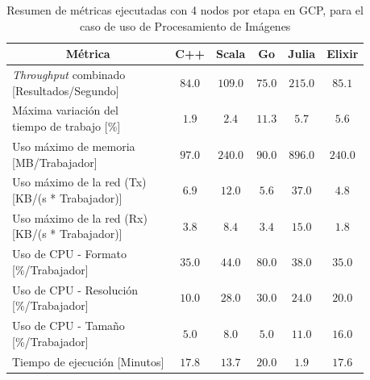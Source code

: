 \documentclass[11pt]{article}
\providecommand{\row}[1]{\parbox{150pt}{\setlength{\baselineskip}{0.2\baselineskip}\strut#1\strut}}
\newcommand{\english}[1]{\textit{#1}}
\begin{document}
\begin{table}[H]
\centering
\begin{tabular}{|l|c|c|c|c|c|}
\hline
\multicolumn{1}{|c|}{Métrica} & C++ & Scala & Go & Julia & Elixir \\ \hline
\row{\english{Throughput} combinado \\ {[Resultados/Segundo]}} & $84.0$ & $109.0$ & $75.0$ & $215.0$ & $85.1$ \\ \hline
\row{Máxima variación del \\ tiempo de trabajo {[}\%{]}} & $1.9$ & $2.4$ & $11.3$ & $5.7$ & $5.6$ \\ \hline
\row{Uso máximo de memoria \\ {[}MB/Trabajador{]}} & $97.0$ & $240.0$ & $90.0$ & $896.0$ & $240.0$ \\ \hline
\row{Uso máximo de la red (Tx) \\ {[}KB/(s * Trabajador){]}} & $6.9$ & $12.0$ & $5.6$ & $37.0$ & $4.8$ \\ \hline
\row{Uso máximo de la red (Rx)\\ {[}KB/(s * Trabajador){]}} & $3.8$ & $8.4$ & $3.4$ & $15.0$ & $1.8$ \\ \hline
\row{Uso de CPU - Formato \\ {[\%/Trabajador]}} & $35.0$ & $44.0$ & $80.0$ & $38.0$ & $35.0$ \\ \hline
\row{Uso de CPU - Resolución \\ {[\%/Trabajador]}} & $10.0$ & $28.0$ & $30.0$ & $24.0$ & $20.0$ \\ \hline
\row{Uso de CPU - Tamaño \\ {[\%/Trabajador]}} & $5.0$ & $8.0$ & $5.0$ & $11.0$ & $16.0$ \\ \hline
Tiempo de ejecución {[}Minutos{]} & $17.8$ & $13.7$ & $20.0$ & $1.9$ & $17.6$ \\ \hline
\end{tabular}
\caption{Resumen de métricas ejecutadas con 4 nodos por etapa en GCP, para el caso de uso de Procesamiento de Imágenes}
\end{table}
\end{document}
